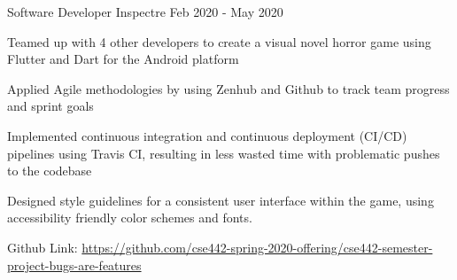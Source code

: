 \begin{cventries}
  \cventry
    {Software Developer} %
    {Inspectre} %
    {} %
    {Feb 2020 - May 2020} %
    {
      \begin{cvitems} %
        \item Teamed up with 4 other developers to create a visual novel horror game using Flutter and Dart for the Android platform
        \item Applied Agile methodologies by using Zenhub and Github to track team progress and sprint goals
        \item Implemented continuous integration and continuous deployment (CI/CD) pipelines using Travis CI, resulting in less wasted time with problematic pushes to the codebase
        \item Designed style guidelines for a consistent user interface within the game, using accessibility friendly color schemes and fonts.
        \item Github Link: \url{https://github.com/cse442-spring-2020-offering/cse442-semester-project-bugs-are-features}
      \end{cvitems}
    }



\end{cventries}
